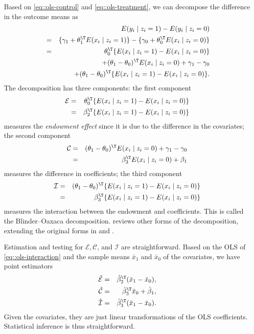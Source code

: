 Based on \eqref{eq::ols-control} and \eqref{eq::ols-treatment}, we can decompose the difference in the outcome means as
\begin{eqnarray*}
&& E(y_i \mid z_i = 1) - E(y_i \mid z_i = 0) \\
&=&  \{ \gamma_1 + \theta_1^{\T} E(x_i \mid z_i = 1)  \} - \{ \gamma_0 + \theta_0^{\T} E(x_i \mid z_i = 0 )  \} \\
&=& \theta_0^{\T}  \{ E(x_i \mid z_i = 1)  -   E(x_i \mid z_i = 0 ) \}  \\
&&  + (\theta_1 - \theta_0) ^{\T}   E(x_i \mid z_i = 0 )    +  \gamma_1 - \gamma_0  \\
&&  + (\theta_1 - \theta_0) ^{\T} \{ E(x_i \mid z_i = 1)  -   E(x_i \mid z_i = 0 ) \} .
\end{eqnarray*}
The decomposition has three components: the first component 
\begin{eqnarray*}
\mathcal E 
&=& 
\theta_0^{\T}  \{ E(x_i \mid z_i = 1)  -   E(x_i \mid z_i = 0 ) \}  \\
&=& \beta_2^{\T}  \{ E(x_i \mid z_i = 1)  -   E(x_i \mid z_i = 0 ) \} 
\end{eqnarray*}
measures the {\it endowment effect} since it is due to the difference in the covariates; the second component
\begin{eqnarray*}
\mathcal C 
&=& 
(\theta_1 - \theta_0) ^{\T}   E(x_i \mid z_i = 0 )    +  \gamma_1 - \gamma_0  \\
&=& \beta_3^{\T}   E(x_i \mid z_i = 0 ) + \beta_1
\end{eqnarray*}
measures the difference in coefficients; the third component 
\begin{eqnarray*}
\mathcal I 
&=& 
(\theta_1 - \theta_0) ^{\T} \{ E(x_i \mid z_i = 1)  -   E(x_i \mid z_i = 0 ) \} \\
&=& \beta_3^{\T}  \{ E(x_i \mid z_i = 1)  -   E(x_i \mid z_i = 0 ) \}
\end{eqnarray*}
measures the interaction between the endowment and coefficients. This is called the Blinder--Oaxaca decomposition. \citet{jann2008blinder} reviews other forms of the decomposition, extending the original forms in \citet{blinder1973wage} and \citet{oaxaca1973male}. 

Estimation and testing for $\mathcal E, \mathcal C$, and $\mathcal I$ are straightforward. Based on the OLS of \eqref{eq::ols-interaction} and the sample means $\bar{x}_1$ and $\bar{x}_0$ of the covariates, we have point estimators
\begin{eqnarray*}
\hat{\mathcal E} &=& \hat \beta_2^{\T} (\bar{x}_1 - \bar{x}_0),\\ 
\hat{\mathcal C} &=& \hat \beta_3^{\T}  \bar{x}_0 +  \hat \beta_1,\\ 
\hat{\mathcal I} &=& \hat \beta_3^{\T} (\bar{x}_1 - \bar{x}_0).
\end{eqnarray*}
Given the covariates, they are just linear transformations of the OLS coefficients. Statistical inference is thus straightforward. 


